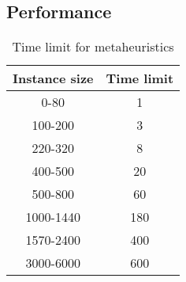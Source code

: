 
\subsection{Performance}

\begin{table}[htbp]
	\centering
	\begin{tabular}{|c|c|}
        \hline \textbf{Instance size} & \textbf{Time limit} \\
		\hline 0-80 & 1 \\
		\hline 100-200 & 3 \\
        \hline 220-320 & 8 \\
        \hline 400-500 & 20 \\
        \hline 500-800 & 60 \\
        \hline 1000-1440 & 180 \\
        \hline 1570-2400 & 400 \\
        \hline 3000-6000 & 600 \\
        \hline
	\end{tabular}
    \vspace{2mm}    
	\caption{Time limit for metaheuristics} \label{tab:metaheurTlim}
\end{table}


